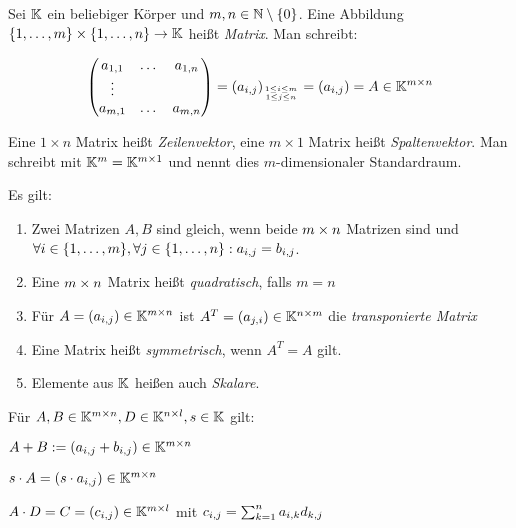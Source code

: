 \begin{definition}[Matrix]
	Sei $\mathbb{K}$ ein beliebiger Körper und $m,n \in \mathbb{N} \setminus \{0\}$. Eine Abbildung $\{ 1, \dots, m \} \times \{ 1, \dots, n \} \rightarrow \mathbb{K}$ heißt \emph{Matrix}. Man schreibt:

	\begin{align*}
		\begin{pmatrix}
			a_{1,1} & \dots & a_{1,n} \\
			\vdots  &       &         \\
			a_{m,1} & \dots & a_{m,n}
		\end{pmatrix}
		= (a_{i,j})_{1 \leq i \leq m \atop 1 \leq j \leq n}
		= (a_{i,j}) = A \in \mathbb{K}^{m \times n}
	\end{align*}	

	Eine $1 \times n$ Matrix heißt \emph{Zeilenvektor}, eine $m \times 1$ Matrix heißt \emph{Spaltenvektor}. Man schreibt mit $\mathbb{K}^m = \mathbb{K}^{m \times 1}$ und nennt dies $m$-dimensionaler Standardraum. 
\end{definition}

\begin{definition}
	Es gilt:
	\begin{enumerate}[noitemsep]
		\item Zwei Matrizen $A,B$ sind gleich, wenn beide $m \times n$ Matrizen sind und $\forall i \in \{ 1, \dots, m \}, \forall j \in \{ 1, \dots, n \} : a_{i,j} = b_{i,j}$.
		\item Eine $m \times n$ Matrix heißt \emph{quadratisch}, falls $m=n$
		\item Für $A = (a_{i,j}) \in \mathbb{K}^{m \times n}$ ist $A^T = (a_{j,i}) \in \mathbb{K}^{n \times m} $ die \emph{transponierte Matrix}
		\item Eine Matrix heißt \emph{symmetrisch}, wenn $A^T = A$ gilt.
		\item 	Elemente aus $\mathbb{K}$ heißen auch \emph{Skalare}. 
	\end{enumerate}

\end{definition}

\begin{definition}
	Für $A, B \in \mathbb{K}^{m \times n}, D \in \mathbb{K}^{n \times l}, s \in \mathbb{K}$ gilt:
	\begin{description}[noitemsep]
		\item $A + B := (a_{i,j} + b_{i,j}) \in \mathbb{K}^{m \times n}$
		\item $s \cdot A = (s \cdot a_{i,j}) \in \mathbb{K}^{m \times n}$
		\item $A \cdot D = C = (c_{i,j}) \in \mathbb{K}^{m \times l}$ mit $c_{i,j} = \sum_{k=1}^{n}a_{i,k} d_{k,j}$
	\end{description}
\end{definition}

